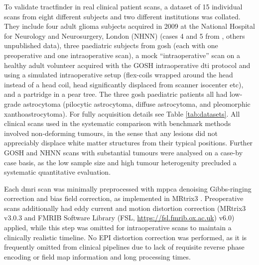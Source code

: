To validate tractfinder in real clinical patient scans, a dataset of 15 individual scans from eight different subjects and two different institutions was collated.
They include four adult glioma subjects acquired in 2009 at the National Hospital for Neurology and Neurosurgery, London (NHNN) (cases 4 and 5 from \textcite{Mancini2022}, others unpublished data),
three paediatric subjects from \gls{gosh} (each with one preoperative and one intraoperative scan),
a mock “intraoperative” scan on a healthy adult volunteer acquired with the GOSH intraoperative \gls{dti} protocol and using a simulated intraoperative setup (flex-coils wrapped around the head instead of a head coil, head significantly displaced from scanner isocenter etc),
and a partridge in a pear tree.
The three \gls{gosh} paediatric patients all had low-grade astrocytoma (pilocytic astrocytoma, diffuse astrocytoma, and pleomorphic xanthoastrocytoma).
For fully acquisition details see Table \ref{tab:datasets}.
All clinical scans used in the systematic comparison with benchmark methods involved non-deforming tumours, in the sense that any lesions did not appreciably displace white matter structures from their typical positions.
Further GOSH and NHNN scans with substantial tumours were analysed on a case-by case basis, as the low sample size and high tumour heterogenity precluded a systematic quantitative evaluation.

Each \gls{dmri} scan was minimally preprocessed with \gls{mppca} denoising\autocite{Veraart2016, Cordero-Grande2019} Gibbs-ringing correction\autocite{Kellner2016} and bias field correction,\autocite{Zhang2001, Smith2004} as implemented in MRtrix3 \autocite{Tournier2019}.
Preoperative scans additionally had eddy current and motion distortion correction\autocite{Andersson2016a, Smith2004} (MRtrix3 v3.0.3 and FMRIB Software Library (FSL, \url{https://fsl.fmrib.ox.ac.uk}) v6.0) applied, while this step was omitted for intraoperative scans to maintain a clinically realistic timeline.
No EPI distortion correction was performed, as it is frequently omitted from clinical pipelines due to lack of requisite reverse phase encoding or field map information and long processing times.\autocite{Yang2022}

